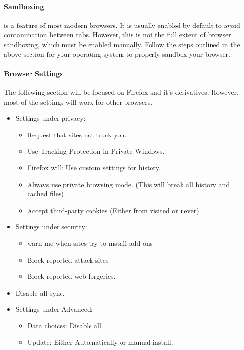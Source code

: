 \documentclass[a4paper,11pt,draft]{article}
\begin{document}
		\paragraph{Sandboxing}
			is a feature of most modern browsers. It is usually enabled by default to avoid contamination between tabs. 
			However, this is not the full extent of browser sandboxing, which must be enabled manually. 
			Follow the steps outlined in the above section for your operating system to properly sandbox your browser. 
		\paragraph{Browser Settings}
			The following section will be focused on Firefox and it's derivatives. 
			However, most of the settings will work for other browsers. 
			\begin{itemize}
				\item Settings under privacy:
					\begin{itemize}
						\item Request that sites not track you. 
						\item Use Tracking Protection in Private Windows. 
						\item Firefox will: Use custom settings for history. 
						\item Always use private browsing mode. (This will break all history and cached files) 
						\item Accept third-party cookies (Either from visited or never)
					\end{itemize}
				\item Settings under security:
					\begin{itemize}
						\item warn me when sites try to install add-ons
						\item Block reported attack sites
						\item Block reported web forgeries. 
					\end{itemize}
				\item Disable all sync. 
				\item Settings under Advanced:
					\begin{itemize}
						\item Data choices: Disable all.
						\item Update: Either Automatically or manual install. 
					\end{itemize}
			\end{itemize}
\end{document}
